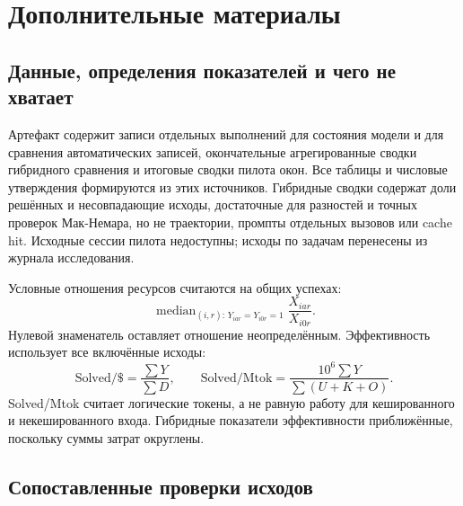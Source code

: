 \clearpage
\section*{Дополнительные материалы}
\setcounter{subsection}{0}
\renewcommand{\thesubsection}{S\arabic{subsection}}
\renewcommand{\thetable}{S\arabic{table}}
\setcounter{table}{0}

\subsection{Данные, определения показателей и чего не хватает}
\label{app:reproducibility}
Артефакт содержит записи отдельных выполнений для состояния модели и для
сравнения автоматических записей, окончательные агрегированные сводки
гибридного сравнения и итоговые сводки пилота окон. Все таблицы и
числовые утверждения формируются из этих источников. Гибридные сводки
содержат доли решённых и несовпадающие исходы, достаточные для разностей
и точных проверок Мак-Немара, но не траектории, промпты отдельных вызовов
или cache hit. Исходные сессии пилота недоступны; исходы по задачам
перенесены из журнала исследования.

Условные отношения ресурсов считаются на общих успехах:
\[
 \operatorname{median}_{(i,r):\,Y_{iar}=Y_{i0r}=1}
 \frac{X_{iar}}{X_{i0r}}.
\]
Нулевой знаменатель оставляет отношение неопределённым. Эффективность
использует все включённые исходы:
\[
 \text{Solved/\$}=\frac{\sum Y}{\sum D},
 \qquad
 \text{Solved/Mtok}=\frac{10^{6}\sum Y}{\sum(U+K+O)}.
\]
Solved/Mtok считает логические токены, а не равную работу для
кешированного и некешированного входа. Гибридные показатели эффективности
приближённые, поскольку суммы затрат округлены.

\subsection{Сопоставленные проверки исходов}
\label{app:contrasts}
\begin{table}[htbp]
\centering\small
\caption{Разности долей решённых задач в процентных пунктах с точными
проверками Мак-Немара. Бутстрэп-интервалы доступны только для состояния
модели.}
\label{tab:contrasts}

\end{table}

\begin{table}[htbp]
\centering\small
\caption{Разности долей решённых задач относительно полной истории внутри
когорт горизонта, заданных контролем (состояние модели).}
\label{tab:horizon-contrasts}

\end{table}

